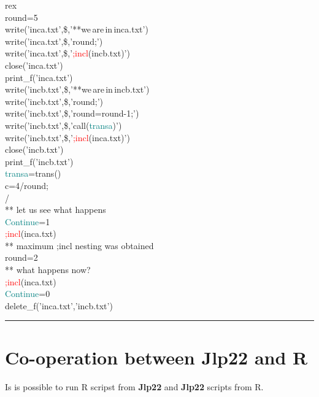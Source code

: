 \singlespacing 
\begin{example}[errorex]rex\\ 
\label{errorex} 
\noindent round=5\\ 
\textcolor{VioletRed}{write}('inca.txt',\$,'**we\,are\,in\,inca.txt')\\ 
\textcolor{VioletRed}{write}('inca.txt',\$,'round;')\\ 
\textcolor{VioletRed}{write}('inca.txt',\$,'\textcolor{Red}{;incl}(incb.txt)')\\ 
\textcolor{VioletRed}{close}('inca.txt')\\ 
\textcolor{VioletRed}{print\_f}('inca.txt')\\ 
\textcolor{VioletRed}{write}('incb.txt',\$,'**we\,are\,in\,incb.txt')\\ 
\textcolor{VioletRed}{write}('incb.txt',\$,'round;')\\ 
\textcolor{VioletRed}{write}('incb.txt',\$,'round=round-1;')\\ 
\textcolor{VioletRed}{write}('incb.txt',\$,'\textcolor{VioletRed}{call}(\textcolor{teal}{transa})')\\ 
\textcolor{VioletRed}{write}('incb.txt',\$,'\textcolor{Red}{;incl}(inca.txt)')\\ 
\textcolor{VioletRed}{close}('incb.txt')\\ 
\textcolor{VioletRed}{print\_f}('incb.txt')\\ 
\textcolor{teal}{transa}=\textcolor{VioletRed}{trans}()\\ 
c=4/round;\\ 
/         \\ 
{\color{ForestGreen}** let us see what happens}\\ 
\textcolor{teal}{Continue}=1\\ 
\textcolor{Red}{;incl}(inca.txt)\\ 
{\color{ForestGreen}** maximum ;incl nesting was obtained}\\ 
 
round=2\\ 
{\color{ForestGreen}** what happens now?}\\ 
\textcolor{Red}{;incl}(inca.txt)\\ 
\textcolor{teal}{Continue}=0\\ 
\textcolor{VioletRed}{delete\_f}('inca.txt','incb.txt')\\ 
\end{example} 
\vspace{-7mm} \rule{5cm}{0.1pt} 
\onehalfspacing 
\section{Co-operation between \textbf{Jlp22} and R} 
\label{JR} 
Is is possible to run R scripst from \textbf{Jlp22} and \textbf{Jlp22} scripts from R. 
